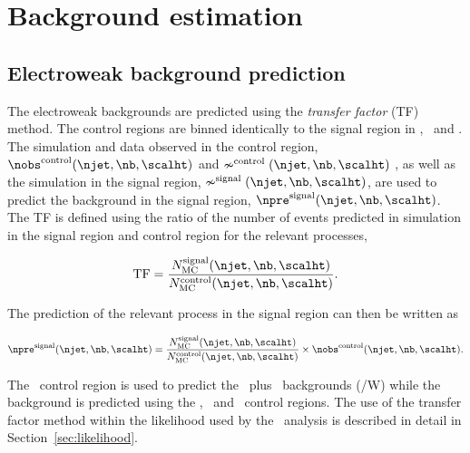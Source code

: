 \section{Background estimation}
\subsection{Electroweak background prediction}
\label{sec:tf-pred}
The electroweak backgrounds are predicted using the \emph{transfer factor} (TF)
method. The control regions are binned identically
to the signal region in \scalht, \nj~and \nb. The simulation and data observed in the control region,
$\nobs^{\rm control}(\njet,\nb,\scalht)$ and $\nsim^{\rm control}(\njet,\nb,\scalht)$ 
, as well as the simulation in the signal region, $\nsim^{\rm signal}(\njet,\nb,\scalht)$, 
are used to predict the background in the signal region, $\npre^{\rm signal}(\njet,\nb,\scalht)$. 
The TF is defined using the ratio of the number of events predicted in 
simulation in the signal region and control region for the relevant processes,

\begin{equation}
  \label{equ:tf-ratio}
  {\rm TF} = \frac{N_{\rm MC}^{\rm signal}(\njet,\nb,\scalht)}{N_{\rm
      MC}^{\rm control}(\njet,\nb,\scalht)}.
\end{equation}

The prediction of the relevant process in the signal region can then be written as

\begin{equation}
  \label{equ:pred-method}
  \npre^{\rm signal}(\njet,\nb,\scalht) = \frac{N_{\rm MC}^{\rm
      signal}(\njet,\nb,\scalht)}{N_{\rm MC}^{\rm
      control}(\njet,\nb,\scalht)} \times \nobs^{\rm
    control}(\njet,\nb,\scalht).
\end{equation}

The \mj~control region is used to predict the \wj~plus \ttbar~backgrounds (\ttbar/W) while the
\znunu background is predicted using the \mj, \mmj~and \gj~control regions. The use of 
the transfer factor method within the likelihood used by the
\alphat~analysis is described in detail in Section~\ref{sec:likelihood}.
%

